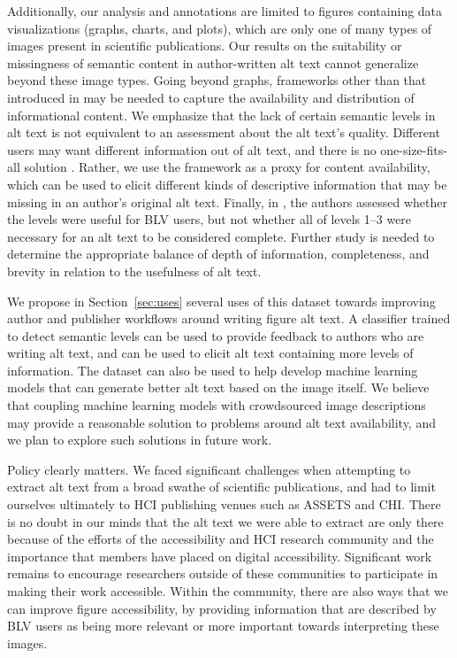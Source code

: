 \documentclass[sigconf]{acmart}
\begin{document}
Additionally, our analysis and annotations are limited to figures containing data visualizations (graphs, charts, and plots), which are only one of many types of images present in scientific publications. Our results on the suitability or missingness of semantic content in author-written alt text cannot generalize beyond these image types. Going beyond graphs, frameworks other than that introduced in \citet{Lundgard2022AccessibleVV} may be needed to capture the availability and distribution of informational content. We emphasize that the lack of certain semantic levels in alt text is not equivalent to an assessment about the alt text's quality. Different users may want different information out of alt text, and there is no one-size-fits-all solution \citep{Mack2021DesigningTF}. Rather, we use the framework as a proxy for content availability, which can be used to elicit different kinds of descriptive information that may be missing in an author's original alt text. Finally, in \citet{Lundgard2022AccessibleVV}, the authors assessed whether the levels were useful for BLV users, but not whether all of levels 1--3 were necessary for an alt text to be considered complete. Further study is needed to determine the appropriate balance of depth of information, completeness, and brevity in relation to the usefulness of alt text.

We propose in Section~\ref{sec:uses} several uses of this dataset towards improving author and publisher workflows around writing figure alt text. A classifier trained to detect semantic levels can be used to provide feedback to authors who are writing alt text, and can be used to elicit alt text containing more levels of information. The dataset can also be used to help develop machine learning models that can generate better alt text based on the image itself. We believe that coupling machine learning models with crowdsourced image descriptions may provide a reasonable solution to problems around alt text availability, and we plan to explore such solutions in future work.

Policy clearly matters. We faced significant challenges when attempting to extract alt text from a broad swathe of scientific publications, and had to limit ourselves ultimately to HCI publishing venues such as ASSETS and CHI. There is no doubt in our minds that the alt text we were able to extract are only there because of the efforts of the accessibility and HCI research community and the importance that members have placed on digital accessibility. Significant work remains to encourage researchers outside of these communities to participate in making their work accessible. Within the community, there are also ways that we can improve figure accessibility, by providing information that are described by BLV users as being more relevant or more important towards interpreting these images.
\end{document}
